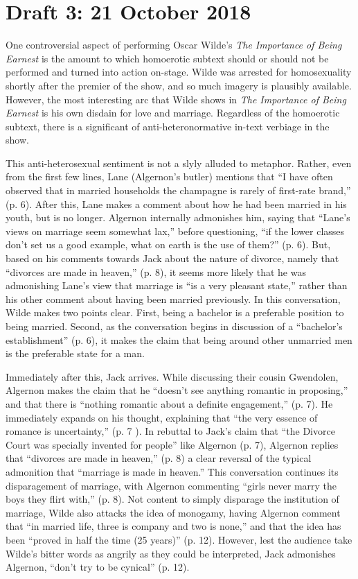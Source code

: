 \documentclass[12pt]{article}[titlepage]
\newcommand{\say}[1]{``#1''}
\newcommand{\1}{\={a}}
\newcommand{\2}{\={e}}
\newcommand{\3}{\={\i}}
\newcommand{\4}{\=o}
\newcommand{\5}{\=u}
\newcommand{\6}{\={A}}
\renewcommand{\,}{\textsuperscript{,}}
\begin{document}
\section{Draft 3: 21 October 2018}
One controversial aspect of performing Oscar Wilde's \textit{The Importance of Being Earnest} is the amount to which homoerotic subtext should or should not be performed and turned into action on-stage.
Wilde was arrested for homosexuality shortly after the premier of the show, and so much imagery is plausibly available.
However, the most interesting arc that Wilde shows in \textit{The Importance of Being Earnest} is his own disdain for love and marriage.
Regardless of the homoerotic subtext, there is a significant of anti-heteronormative in-text verbiage in the show.

This anti-heterosexual sentiment is not a slyly alluded to metaphor.
Rather, even from the first few lines, Lane (Algernon's butler) mentions that \say{I have often observed that in married households the champagne is rarely of first-rate brand,} (p. 6).
After this, Lane makes a comment about how he had been married in his youth, but is no longer.
Algernon internally admonishes him, saying that \say{Lane's views on marriage seem somewhat lax,} before questioning, \say{if the lower classes don't set us a good example, what on earth is the use of them?} (p. 6).
But, based on his comments towards Jack about the nature of divorce, namely that \say{divorces are made in heaven,} (p. 8), it seems more likely that he was admonishing Lane's view that marriage is \say{is a very pleasant state,} rather than his other comment about having been married previously.
In this conversation, Wilde makes two points clear.
First, being a bachelor is a preferable position to being married.
Second, as the conversation begins in discussion of a \say{bachelor's establishment} (p. 6), it makes the claim that being around other unmarried men is the preferable state for a man.

Immediately after this, Jack arrives.
While discussing their cousin Gwendolen, Algernon makes the claim that he \say{doesn't see anything romantic in proposing,} and that there is \say{nothing romantic about a definite engagement,} (p. 7).
He immediately expands on his thought, explaining that \say{the very essence of romance is uncertainty,} (p. 7 ).
In rebuttal to Jack's claim that \say{the Divorce Court was specially invented for people} like Algernon (p. 7), Algernon replies that \say{divorces are made in heaven,} (p. 8) a clear reversal of the typical admonition that \say{marriage is made in heaven.}
This conversation continues its disparagement of marriage, with Algernon commenting \say{girls never marry the boys they flirt with,} (p. 8).
Not content to simply disparage the institution of marriage, Wilde also attacks the idea of monogamy, having Algernon comment that \say{in married life, three is company and two is none,} and that the idea has been \say{proved in half the time (25 years)} (p. 12).
However, lest the audience take Wilde's bitter words as angrily as they could be interpreted, Jack admonishes Algernon, \say{don't try to be cynical} (p. 12).
\end{document}
